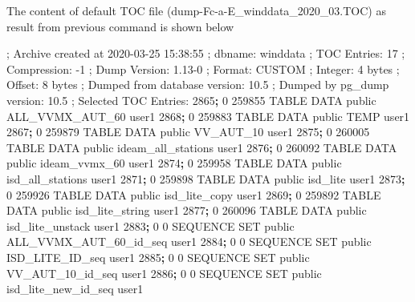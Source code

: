 \documentclass[12pt,oneside]{reedthesis}
\newenvironment{Shaded}{\begin{snugshade}}{\end{snugshade}}
\newcommand{\ExtensionTok}[1]{#1}
\newcommand{\KeywordTok}[1]{\textcolor[rgb]{0.13,0.29,0.53}{\textbf{#1}}}
\newcommand{\NormalTok}[1]{#1}
\begin{document}
The content of default TOC file (dump-Fc-a-E\_winddata\_2020\_03.TOC) as result from previous command is shown below

\scriptsize

\vspace{0.4cm}
\begin{Shaded}
\begin{Highlighting}[]
\NormalTok{      ; }\ExtensionTok{Archive}\NormalTok{ created at 2020-03-25 15:38:55}
\NormalTok{      ;     }\ExtensionTok{dbname}\NormalTok{: winddata}
\NormalTok{      ;     }\ExtensionTok{TOC}\NormalTok{ Entries: 17}
\NormalTok{      ;     }\ExtensionTok{Compression}\NormalTok{: -1}
\NormalTok{      ;     }\ExtensionTok{Dump}\NormalTok{ Version: 1.13-0}
\NormalTok{      ;     }\ExtensionTok{Format}\NormalTok{: CUSTOM}
\NormalTok{      ;     }\ExtensionTok{Integer}\NormalTok{: 4 bytes}
\NormalTok{      ;     }\ExtensionTok{Offset}\NormalTok{: 8 bytes}
\NormalTok{      ;     }\ExtensionTok{Dumped}\NormalTok{ from database version: 10.5}
\NormalTok{      ;     }\ExtensionTok{Dumped}\NormalTok{ by pg_dump version: 10.5}
\NormalTok{      ; }\ExtensionTok{Selected}\NormalTok{ TOC Entries:}
      \ExtensionTok{2865}\KeywordTok{;} \ExtensionTok{0}\NormalTok{ 259855 TABLE DATA public ALL_VVMX_AUT_60 user1}
      \ExtensionTok{2868}\KeywordTok{;} \ExtensionTok{0}\NormalTok{ 259883 TABLE DATA public TEMP user1}
      \ExtensionTok{2867}\KeywordTok{;} \ExtensionTok{0}\NormalTok{ 259879 TABLE DATA public VV_AUT_10 user1}
      \ExtensionTok{2875}\KeywordTok{;} \ExtensionTok{0}\NormalTok{ 260005 TABLE DATA public ideam_all_stations user1}
      \ExtensionTok{2876}\KeywordTok{;} \ExtensionTok{0}\NormalTok{ 260092 TABLE DATA public ideam_vvmx_60 user1}
      \ExtensionTok{2874}\KeywordTok{;} \ExtensionTok{0}\NormalTok{ 259958 TABLE DATA public isd_all_stations user1}
      \ExtensionTok{2871}\KeywordTok{;} \ExtensionTok{0}\NormalTok{ 259898 TABLE DATA public isd_lite user1}
      \ExtensionTok{2873}\KeywordTok{;} \ExtensionTok{0}\NormalTok{ 259926 TABLE DATA public isd_lite_copy user1}
      \ExtensionTok{2869}\KeywordTok{;} \ExtensionTok{0}\NormalTok{ 259892 TABLE DATA public isd_lite_string user1}
      \ExtensionTok{2877}\KeywordTok{;} \ExtensionTok{0}\NormalTok{ 260096 TABLE DATA public isd_lite_unstack user1}
      \ExtensionTok{2883}\KeywordTok{;} \ExtensionTok{0}\NormalTok{ 0 SEQUENCE SET public ALL_VVMX_AUT_60_id_seq user1}
      \ExtensionTok{2884}\KeywordTok{;} \ExtensionTok{0}\NormalTok{ 0 SEQUENCE SET public ISD_LITE_ID_seq user1}
      \ExtensionTok{2885}\KeywordTok{;} \ExtensionTok{0}\NormalTok{ 0 SEQUENCE SET public VV_AUT_10_id_seq user1}
      \ExtensionTok{2886}\KeywordTok{;} \ExtensionTok{0}\NormalTok{ 0 SEQUENCE SET public isd_lite_new_id_seq user1}
\end{Highlighting}
\end{Shaded}
\normalsize
\end{document}
